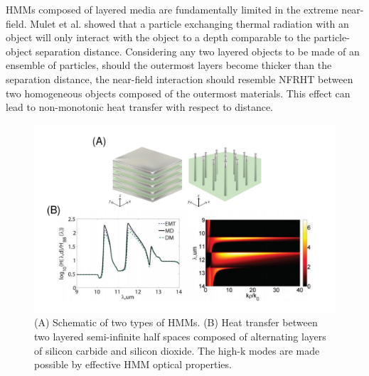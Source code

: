 HMMs composed of layered media are fundamentally limited in the extreme near-field. Mulet et al. showed that a particle exchanging thermal radiation with an object will only interact with the object to a depth comparable to the particle-object separation distance.\cite{Mulet2001} Considering any two layered objects to be made of an ensemble of particles, should the outermost layers become thicker than the separation distance, the near-field interaction should resemble NFRHT between two homogeneous objects composed of the outermost materials. This effect can lead to non-monotonic heat transfer with respect to distance.\cite{Esquivel-Sirvent2016}

\begin{figure}
\centering
\includegraphics[width=\textwidth]{./Figures/HMM.pdf}
\caption{\label{fig:ExactMethods}(A) Schematic of two types of HMMs.\cite{Guo2012a} (B) Heat transfer between two layered semi-infinite half spaces composed of alternating layers of silicon carbide and silicon dioxide. The high-k modes are made possible by effective HMM optical properties.\cite{Guo2013}}
\end{figure}


